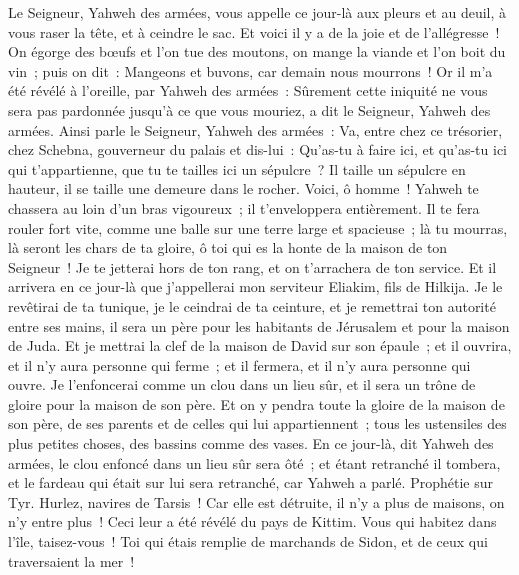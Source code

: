 \begin{multicols}{2}
Le Seigneur, Yahweh des armées, vous appelle ce jour-là aux pleurs et au deuil, à vous raser la tête, et à ceindre le sac.
Et voici il y a de la joie et de l'allégresse~! On égorge des bœufs et l'on tue des moutons, on mange la viande et l'on boit du vin~; puis on dit~: Mangeons et buvons, car demain nous mourrons~!
Or il m'a été révélé à l'oreille, par Yahweh des armées~: Sûrement cette iniquité ne vous sera pas pardonnée jusqu'à ce que vous mouriez, a dit le Seigneur, Yahweh des armées.
Ainsi parle le Seigneur, Yahweh des armées~: Va, entre chez ce trésorier, chez Schebna, gouverneur du palais et dis-lui~:
Qu'as-tu à faire ici, et qu'as-tu ici qui t'appartienne, que tu te tailles ici un sépulcre~? Il taille un sépulcre en hauteur, il se taille une demeure dans le rocher.
Voici, ô homme~! Yahweh te chassera au loin d'un bras vigoureux~; il t'enveloppera entièrement.
Il te fera rouler fort vite, comme une balle sur une terre large et spacieuse~; là tu mourras, là seront les chars de ta gloire, ô toi qui es la honte de la maison de ton Seigneur~!
Je te jetterai hors de ton rang, et on t'arrachera de ton service.
Et il arrivera en ce jour-là que j'appellerai mon serviteur Eliakim, fils de Hilkija.
Je le revêtirai de ta tunique, je le ceindrai de ta ceinture, et je remettrai ton autorité entre ses mains, il sera un père pour les habitants de Jérusalem et pour la maison de Juda.
Et je mettrai la clef de la maison de David sur son épaule~; et il ouvrira, et il n'y aura personne qui ferme~; et il fermera, et il n'y aura personne qui ouvre.
Je l'enfoncerai comme un clou dans un lieu sûr, et il sera un trône de gloire pour la maison de son père.
Et on y pendra toute la gloire de la maison de son père, de ses parents et de celles qui lui appartiennent~; tous les ustensiles des plus petites choses, des bassins comme des vases. 
En ce jour-là, dit Yahweh des armées, le clou enfoncé dans un lieu sûr sera ôté~; et étant retranché il tombera, et le fardeau qui était sur lui sera retranché, car Yahweh a parlé.
\VerseOne{}Prophétie sur Tyr. Hurlez, navires de Tarsis~! Car elle est détruite, il n'y a plus de maisons, on n'y entre plus~! Ceci leur a été révélé du pays de Kittim.
Vous qui habitez dans l'île, taisez-vous~! Toi qui étais remplie de marchands de Sidon, et de ceux qui traversaient la mer~!

\end{multicols}
